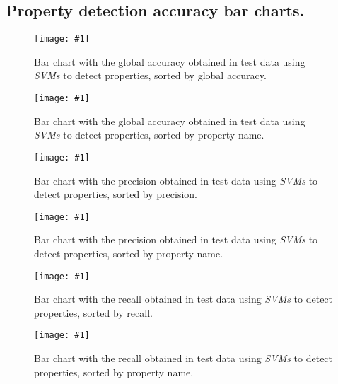 \documentclass[12pt,a4paper]{article}
\begin{document}
\begin{singlespace}
\clearpage
\section{Property detection accuracy bar charts.}

\newcommand{\barchartSize}{1}
\newcommand{\plotbarchart}[2]
{
    \begin{figure}[!ht]
        \centering
        \texttt{[image: \#1]}
        \caption{#2}
    \end{figure}
}

\plotbarchart{../../Figures/3 - Properties detection global accuracy (sorted).png}
{Bar chart with the global accuracy obtained in test data using \emph{SVMs} to detect properties, sorted by global accuracy.}

\plotbarchart{../../Figures/3 - Properties detection global accuracy.png}
{Bar chart with the global accuracy obtained in test data using \emph{SVMs} to detect properties, sorted by property name.}

\newpage
\plotbarchart{../../Figures/3 - Properties detection precision (sorted).png}
{Bar chart with the precision obtained in test data using \emph{SVMs} to detect properties, sorted by precision.}

\plotbarchart{../../Figures/3 - Properties detection precision.png}
{Bar chart with the precision obtained in test data using \emph{SVMs} to detect properties, sorted by property name.}

\newpage
\plotbarchart{../../Figures/3 - Properties detection recall (sorted).png}
{Bar chart with the recall obtained in test data using \emph{SVMs} to detect properties, sorted by recall.}

\plotbarchart{../../Figures/3 - Properties detection recall.png}
{Bar chart with the recall obtained in test data using \emph{SVMs} to detect properties, sorted by property name.}


\end{singlespace}
\end{document}
